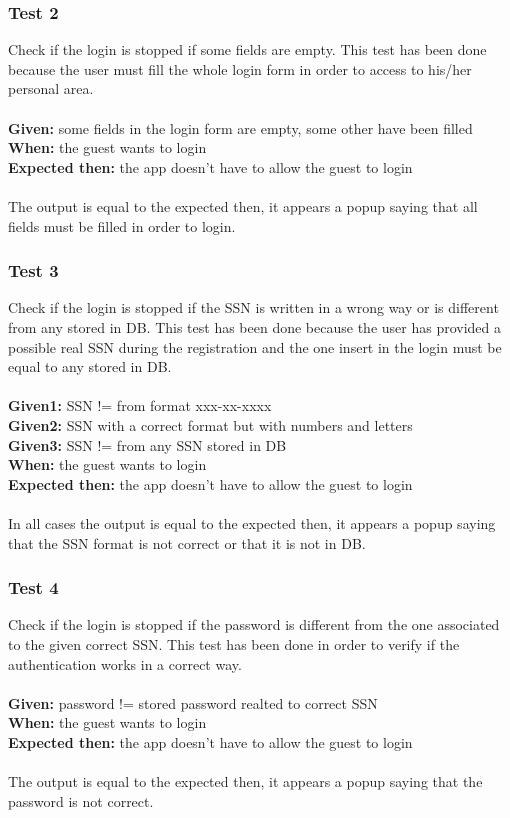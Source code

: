 \subsubsection{\Large{Test 2}}
Check if the login is stopped if some fields are empty. This test has been done because the user must fill the whole login form in order to access to his/her personal area.\\
\\
\textbf{Given: } some fields in the login form are empty, some other have been filled\\
\textbf{When: } the guest wants to login\\
\textbf{Expected then: } the app doesn't have to allow the guest to login\\
\\
The output is equal to the expected then, it appears a popup saying that all fields must be filled in order to login. 

\subsubsection{\Large{Test 3}}
Check if the login is stopped if the SSN is written in a wrong way or is different from any stored in DB. This test has been done because the user has provided a possible real SSN during the registration and the one insert in the login must be equal to any stored in DB.\\
\\
\textbf{Given1: } SSN != from format xxx-xx-xxxx \\
\textbf{Given2: } SSN with a correct format but with numbers and letters\\
\textbf{Given3: } SSN != from any SSN stored in DB\\
\textbf{When: } the guest wants to login\\
\textbf{Expected then: } the app doesn't have to allow the guest to login\\
\\
In all cases the output is equal to the expected then, it appears a popup saying that the SSN format is not correct or that it is not in DB.

\subsubsection{\Large{Test 4}}
Check if the login is stopped if the password is different from the one associated to the given correct SSN. This test has been done in order to verify if the authentication works in a correct way.\\
\\
\textbf{Given: } password != stored password realted to correct SSN\\
\textbf{When: } the guest wants to login\\
\textbf{Expected then: } the app doesn't have to allow the guest to login\\
\\
The output is equal to the expected then, it appears a popup saying that the password is not correct.

